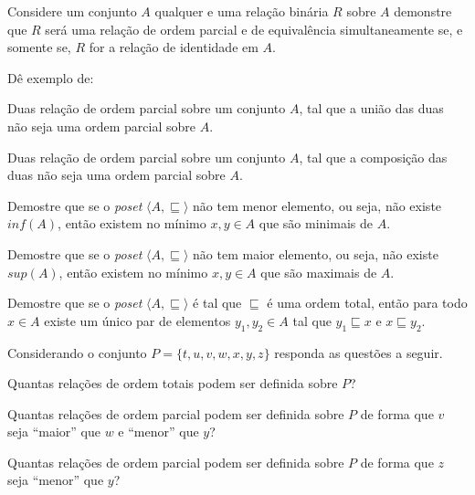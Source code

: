\begin{questao}\label{test:EquivalenciaOrdem19}
	Considere um conjunto $A$ qualquer e uma relação binária $R$ sobre $A$ demonstre que $R$ será uma relação de ordem parcial e de equivalência simultaneamente se, e somente se, $R$ for a relação de identidade em $A$.
\end{questao}

\begin{questao}\label{test:EquivalenciaOrdem20}
	Dê exemplo de:
\end{questao}

\begin{exerList}
	\item Duas relação de ordem parcial sobre um conjunto $A$, tal que a união das duas não seja uma ordem parcial sobre $A$.
	\item Duas relação de ordem parcial sobre um conjunto $A$, tal que a composição das duas não seja uma ordem parcial sobre $A$.
\end{exerList}

\begin{questao}\label{test:EquivalenciaOrdem21}
	Demostre que se o \textit{poset} $\langle A, \sqsubseteq \rangle$ não tem menor elemento, ou seja, não existe $inf(A)$, então existem no mínimo $x, y \in A$ que são minimais de $A$.
\end{questao}

\begin{questao}\label{test:EquivalenciaOrdem22}
	Demostre que se o \textit{poset} $\langle A, \sqsubseteq \rangle$ não tem maior elemento, ou seja, não existe $sup(A)$, então existem no mínimo $x, y \in A$ que são maximais de $A$.
\end{questao}

\begin{questao}\label{test:EquivalenciaOrdem23}
	Demostre que se o \textit{poset} $\langle A, \sqsubseteq \rangle$ é tal que $\sqsubseteq$ é uma ordem total, então para todo $x \in A$ existe um único par de elementos $y_1, y_2 \in A$ tal que $y_1 \sqsubseteq x$ e $x \sqsubseteq y_2$.
\end{questao}

\begin{questao}\label{test:EquivalenciaOrdem24}
	Considerando o conjunto $P = \{t, u, v, w, x, y, z\}$ responda as questões a seguir.
\end{questao}

\begin{exerList}
	\item Quantas relações de ordem totais podem ser definida sobre $P$?
	\item Quantas relações de ordem parcial podem ser definida sobre $P$ de forma que $v$ seja ``maior'' que $w$ e ``menor'' que $y$?
	\item Quantas relações de ordem parcial podem ser definida sobre $P$ de forma que $z$ seja ``menor'' que $y$?
\end{exerList}

